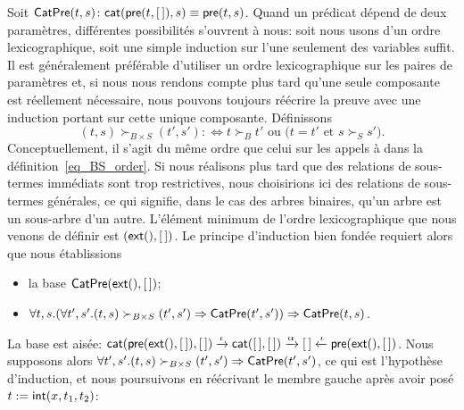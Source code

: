 Soit \(\textsf{CatPre}({t,s}) \colon \textsf{cat}(\textsf{pre}(t,[\,]),s) \equiv
\textsf{pre}(t,s)\). Quand
un prédicat dépend de deux paramètres, différentes possibilités
s'ouvrent à nous: soit nous usons d'un ordre lexicographique, soit une
simple induction sur l'une seulement des variables suffit. Il est
généralement préférable d'utiliser un ordre
lexicographique sur les paires
de paramètres et, si nous nous rendons compte plus tard qu'une seule
composante est réellement nécessaire, nous pouvons toujours réécrire
la preuve avec une induction portant sur cette unique
composante. Définissons
\begin{equation*}
(t,s) \succ_{B \times S} (t',s') :\Leftrightarrow \text{\(t \succ_{B}
    t'\) ou (\(t = t'\) et \(s \succ_{S} s'\))}.
\end{equation*}
Conceptuellement, il s'agit du même ordre que celui sur les appels à
 dans la
définition~\eqref{eq_BS_order}. Si nous réalisons plus tard que des
relations de sous-termes immédiats sont trop restrictives, nous
choisirions ici des relations de sous-termes générales, ce qui
signifie, dans le cas des arbres binaires, qu'un arbre est un
sous-arbre d'un autre. L'élément minimum de l'ordre lexicographique
que nous venons de définir est \((\textsf{ext}(),[\,])\). Le principe
d'induction bien fondée requiert alors que nous établissions
\begin{itemize}

  \item la base \(\textsf{CatPre}({\textsf{ext}(),[\,]})\);

  \item \(\forall t,s. (\forall t',s'.(t,s) \succ_{B \times S} (t',s')
    \Rightarrow \textsf{CatPre}({t',s'})) \Rightarrow
    \textsf{CatPre}({t,s})\).

\end{itemize}
La base est aisée: \(\textsf{cat}(\textsf{pre}(\textsf{ext}(),[\,]),[\,])
\xrightarrow{\smash{\iota}} \textsf{cat}([\,],[\,])
\xrightarrow{\smash{\alpha}} [\,] \xleftarrow{\smash{\iota}}
\textsf{pre}(\textsf{ext}(),[\,])\). Nous supposons
alors \(\forall t',s'.(t,s) \succ_{B \times S} (t',s') \Rightarrow
\textsf{CatPre}({t',s'})\), ce qui est l'hypothèse d'induction, et nous
poursuivons en réécrivant le membre gauche après avoir posé \(t :=
\textsf{int}(x,t_1,t_2)\):
